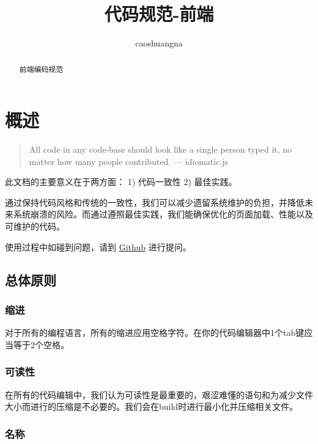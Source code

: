 \documentclass[]{report}
\title{代码规范-前端}
\author{caoshuangna}
\date{}
\begin{document}
\maketitle
\begin{abstract}
前端编码规范
\end{abstract}

{
\setcounter{tocdepth}{1}
\tableofcontents
}
\hypertarget{ux6982ux8ff0}{%
\chapter{概述}\label{ux6982ux8ff0}}

\begin{quote}
All code in any code-base should look like a single person typed it, no
matter how many people contributed. --- idiomatic.js
\end{quote}

此文档的主要意义在于两方面： 1) 代码一致性 2) 最佳实践。

通过保持代码风格和传统的一致性，我们可以减少遗留系统维护的负担，并降低未来系统崩溃的风险。而通过遵照最佳实践，我们能确保优化的页面加载、性能以及可维护的代码。

使用过程中如碰到问题，请到
\href{https://github.com/shiwenna/codingStandards}{Github} 进行提问。

\hypertarget{ux603bux4f53ux539fux5219}{%
\section{总体原则}\label{ux603bux4f53ux539fux5219}}

\hypertarget{ux7f29ux8fdb}{%
\subsection{缩进}\label{ux7f29ux8fdb}}

对于所有的编程语言，所有的缩进应用空格字符。在你的代码编辑器中1个tab键应当等于2个空格。

\hypertarget{ux53efux8bfbux6027}{%
\subsection{可读性}\label{ux53efux8bfbux6027}}

在所有的代码编辑中，我们认为可读性是最重要的，艰涩难懂的语句和为减少文件大小而进行的压缩是不必要的。我们会在build时进行最小化并压缩相关文件。

\hypertarget{ux540dux79f0}{%
\subsection{名称}\label{ux540dux79f0}}
\end{document}
